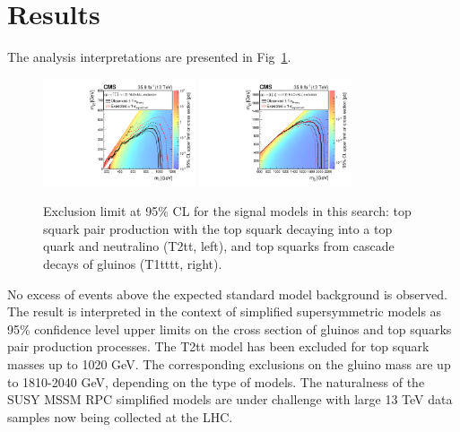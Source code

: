 \documentclass{PoS}
\begin{document}
\section{Results}

The analysis interpretations are presented in Fig~\ref{fig:signal_results}. 

\begin{figure}[ht!]
 \begin{centering}
  \includegraphics[width=0.40\textwidth]{figures/Covered_T2tt_OnlyXSEC.pdf}
  \includegraphics[width=0.40\textwidth]{figures/T1tttt_OnlyXSEC.pdf}
  \caption{Exclusion limit at 95\% CL for the signal models in this search: top squark pair production with the top squark decaying into a top quark and neutralino (T2tt, left), and top squarks from cascade decays of gluinos (T1tttt, right).}
  \label{fig:signal_results}
 \end{centering}
\end{figure}

No excess of events above the expected standard model background is observed. The result is interpreted in the context of simplified supersymmetric models as 95\% confidence level upper limits on the cross section of gluinos and top squarks pair production processes. The T2tt model has been excluded for top squark masses up to 1020 GeV. The corresponding exclusions on the gluino mass are up to 1810-2040 GeV, depending on the type of models. The naturalness\cite{Papucci:2011wy} of the SUSY MSSM RPC simplified models are under challenge with large 13 TeV data samples now being collected at the LHC.



\end{document}

